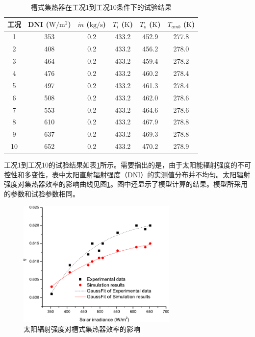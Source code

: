 \begin{table}[htbp]\footnotesize
	\caption{槽式集热器在工况1到工况10条件下的试验结果}
	\begin{center}
	\begin{tabular}{cccccc}
		\toprule
		工况	& DNI ($\mathrm{W/m^2}$)	&	$\dot{m}$ ($\mathrm{kg/s}$)			&	$T_i$ ($\mathrm{K}$)	&	$T_o$ ($\mathrm{K}$)		&	$T_{amb}$ ($\mathrm{K}$)\\
		\midrule
		1	&	353	&	0.2	&	433.2	&	452.9	&	277.8\\
		2	&	408	&	0.2	&	433.2	&	456.2	&	278.0\\
		3	&	464	&	0.2	&	433.2	&	459.4	&	278.2\\
		4	&	476	&	0.2	&	433.2	&	460.2	&	278.4\\
		5	&	497	&	0.2	&	433.2	&	461.3	&	278.4\\
		6	&	508	&	0.2	&	433.2	&	462.0	&	278.6\\
		7	&	553	&	0.2	&	433.2	&	464.6	&	278.6\\
		8	&	610	&	0.2	&	433.2	&	467.9	&	278.8\\
		9	&	637	&	0.2	&	433.2	&	469.3	&	278.8\\
		10	&	652	&	0.2	&	433.2	&	470.2	&	278.9\\
		\bottomrule
	\end{tabular}
	\end{center}
	\label{tab:ResultOfTrough1}
\end{table}
工况1到工况10的试验结果如表\ref{tab:ResultOfTrough1}所示。需要指出的是，由于太阳能辐射强度的不可控性和多变性，表中太阳直射辐射强度（DNI）的实测值分布并不均匀。太阳辐射强度对集热器效率的影响曲线见图\ref{fig:I_r-eta-trough}。图中还显示了模型计算的结果。模型所采用的参数和试验参数相同。
\begin{figure}[!ht]
\centering
\includegraphics[width=0.7\textwidth]{fig/I_r-eta-trough}
\caption{太阳辐射强度对槽式集热器效率的影响}
\label{fig:I_r-eta-trough}
\end{figure}

